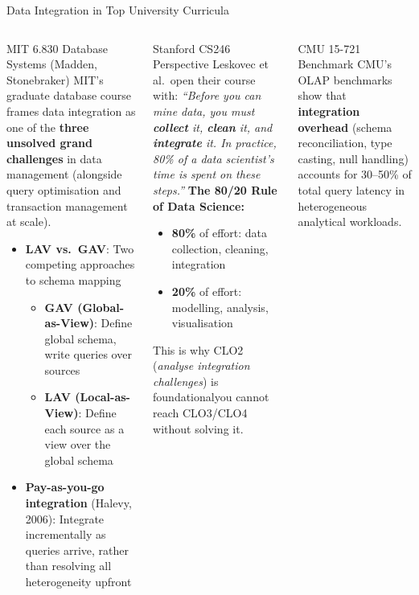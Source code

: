 \documentclass[aspectratio=169,10pt]{beamer}
\begin{document}
\begin{frame}{Data Integration in Top University Curricula}
  \begin{columns}[T]
      \begin{block}{MIT 6.830 Database Systems (Madden, Stonebraker)}
        \small MIT's graduate database course frames data integration as one of the \textbf{three unsolved grand challenges} in data management (alongside query optimisation and transaction management at scale).
        \vspace{4pt}
        \begin{itemize}
          \item \textbf{LAV vs.\ GAV}: Two competing approaches to schema mapping
          \begin{itemize}
            \scriptsize
            \item \textbf{GAV (Global-as-View)}: Define global schema, write queries over sources
            \item \textbf{LAV (Local-as-View)}: Define each source as a view over the global schema
          \end{itemize}
          \item \textbf{Pay-as-you-go integration} (Halevy, 2006): Integrate incrementally as queries arrive, rather than resolving all heterogeneity upfront
        \end{itemize}
      \end{block}

      \begin{exampleblock}{Stanford CS246 Perspective}
        Leskovec et al.\ open their course with:
        \vspace{4pt}
        \textit{``Before you can mine data, you must \textbf{collect} it, \textbf{clean} it, and \textbf{integrate} it.  In practice, 80\% of a data scientist's time is spent on these steps.''}
        \vspace{6pt}
        \textbf{The 80/20 Rule of Data Science:}
        \begin{itemize}
          \small
          \item \textbf{80\%} of effort: data collection, cleaning, integration
          \item \textbf{20\%} of effort: modelling, analysis, visualisation
        \end{itemize}
        \vspace{4pt}
        This is why CLO2 (\textit{analyse integration challenges}) is foundational\textemdash you cannot reach CLO3/CLO4 without solving it.
      \end{exampleblock}
      \vspace{4pt}
      \begin{alertblock}{CMU 15-721 Benchmark}
        CMU's OLAP benchmarks show that \textbf{integration overhead} (schema reconciliation, type casting, null handling) accounts for 30--50\% of total query latency in heterogeneous analytical workloads.
      \end{alertblock}
  \end{columns}
\end{frame}
\end{document}
